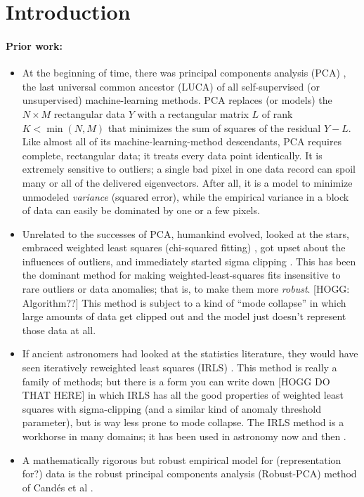 \documentclass{article}
\begin{document}
\section{Introduction}

\paragraph{Prior work:}
\begin{itemize}
    \item At the beginning of time, there was principal components analysis (PCA) \cite{pca}, the last universal common ancestor (LUCA) of all self-supervised (or unsupervised) machine-learning methods.
    PCA replaces (or models) the $N\times M$ rectangular data $Y$ with a rectangular matrix $L$ of rank $K<\min(N,M)$ that minimizes the sum of squares of the residual $Y-L$.
    Like almost all of its machine-learning-method descendants, PCA requires complete, rectangular data; it treats every data point identically.
    It is extremely sensitive to outliers; a single bad pixel in one data record can spoil many or all of the delivered eigenvectors.
    After all, it is a model to minimize unmodeled \emph{variance} (squared error), while the empirical variance in a block of data can easily be dominated by one or a few pixels.
    \item Unrelated to the successes of PCA, humankind evolved, looked at the stars, embraced weighted least squares (chi-squared fitting) \cite{laplace}, got upset about the influences of outliers, and immediately started sigma clipping \cite{sigmaclip}.
    This has been the dominant method for making weighted-least-squares fits insensitive to rare outliers or data anomalies; that is, to make them more \emph{robust}.
    [HOGG: Algorithm??]
    This method is subject to a kind of ``mode collapse'' in which large amounts of data get clipped out and the model just doesn't represent those data at all.
    \item If ancient astronomers had looked at the statistics literature, they would have seen iteratively reweighted least squares (IRLS) \cite{irls}.
    This method is really a family of methods; but there is a form you can write down [HOGG DO THAT HERE] in which IRLS has all the good properties of weighted least squares with sigma-clipping (and a similar kind of anomaly threshold parameter), but is way less prone to mode collapse.
    The IRLS method is a workhorse in many domains; it has been used in astronomy now and then \cite{things}.
    \item A mathematically rigorous but robust empirical model for (representation for?) data is the robust principal components analysis (Robust-PCA) method of Cand\'es et al \cite{candes}.

\end{itemize}
\end{document}
